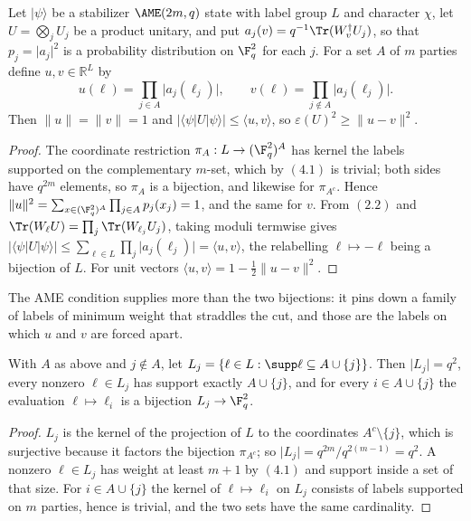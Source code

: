\begin{proposition}\label{prop:half-splitting}
Let \(\lvert\psi\rangle\) be a stabilizer \(\AME(2m,q)\) state with label
group \(L\) and character \(\chi\), let \(U=\bigotimes_jU_j\) be a product
unitary, and put \(a_j(v)=q^{-1}\Tr(W_v^\dagger U_j)\), so that
\(p_j=\lvert a_j\rvert^2\) is a probability distribution on \(\F_q^2\) for
each \(j\).  For a set \(A\) of \(m\) parties define \(u,v\in\mathbb R^L\)
by
\[
 u(\ell)=\prod_{j\in A}\lvert a_j(\ell_j)\rvert,\qquad
 v(\ell)=\prod_{j\notin A}\lvert a_j(\ell_j)\rvert .
\]
Then \(\lVert u\rVert=\lVert v\rVert=1\) and
\(\lvert\langle\psi\rvert U\lvert\psi\rangle\rvert\leq\langle u,v\rangle\),
so \(\varepsilon(U)^2\geq\lVert u-v\rVert^2\).
\end{proposition}

\begin{proof}
The coordinate restriction \(\pi_A:L\to(\F_q^2)^A\) has kernel the labels
supported on the complementary \(m\)-set, which by \((4.1)\) is trivial;
both sides have \(q^{2m}\) elements, so \(\pi_A\) is a bijection, and
likewise for \(\pi_{A^c}\).  Hence
\(\lVert u\rVert^2=\sum_{x\in(\F_q^2)^A}\prod_{j\in A}p_j(x_j)=1\), and the
same for \(v\).  From \((2.2)\) and
\(\Tr(W_\ell U)=\prod_j\Tr(W_{\ell_j}U_j)\), taking moduli termwise gives
\(\lvert\langle\psi\rvert U\lvert\psi\rangle\rvert
\leq\sum_{\ell\in L}\prod_j\lvert a_j(\ell_j)\rvert=\langle u,v\rangle\),
the relabelling \(\ell\mapsto-\ell\) being a bijection of \(L\).  For unit
vectors \(\langle u,v\rangle=1-\frac12\lVert u-v\rVert^2\).
\end{proof}

The AME condition supplies more than the two bijections: it pins down a
family of labels of minimum weight that straddles the cut, and those are
the labels on which \(u\) and \(v\) are forced apart.

\begin{lemma}\label{lem:cut-transversal}
With \(A\) as above and \(j\notin A\), let
\(L_j=\{\ell\in L:\supp\ell\subseteq A\cup\{j\}\}\).  Then
\(\lvert L_j\rvert=q^2\), every nonzero \(\ell\in L_j\) has support exactly
\(A\cup\{j\}\), and for every \(i\in A\cup\{j\}\) the evaluation
\(\ell\mapsto\ell_i\) is a bijection \(L_j\to\F_q^2\).
\end{lemma}

\begin{proof}
\(L_j\) is the kernel of the projection of \(L\) to the coordinates
\(A^c\setminus\{j\}\), which is surjective because it factors the bijection
\(\pi_{A^c}\); so \(\lvert L_j\rvert=q^{2m}/q^{2(m-1)}=q^2\).  A nonzero
\(\ell\in L_j\) has weight at least \(m+1\) by \((4.1)\) and support inside
a set of that size.  For \(i\in A\cup\{j\}\) the kernel of
\(\ell\mapsto\ell_i\) on \(L_j\) consists of labels supported on \(m\)
parties, hence is trivial, and the two sets have the same cardinality.
\end{proof}

